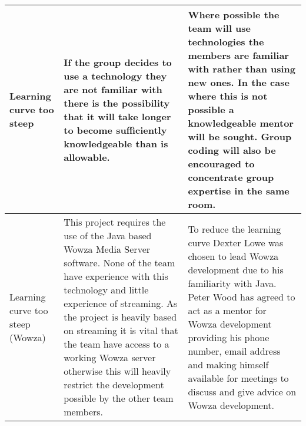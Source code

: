 \begin{center}
\begin{landscape}
\begin{longtable}{|p{3cm}|p{7cm}|p{12cm}|}
        Learning curve too steep                         & If the group decides to use a technology they are not familiar with there is the possibility that it will take longer to become sufficiently knowledgeable than is allowable.                                                                                                                                                                                                & Where possible the team will use technologies the members are familiar with rather than using new ones. In the case where this is not possible a knowledgeable mentor will be sought. Group coding will also be encouraged to concentrate group expertise in the same room.                                                                                                                                                                                                                                                                                                                                                                                                                                                                                                                                                                                                                                                                                                                                                              \\ \hline
        Learning curve too steep (Wowza)                 & This project requires the use of the Java based Wowza Media Server software. None of the team have experience with this technology and little experience of streaming. As the project is heavily based on streaming it is vital that the team have access to a working Wowza server otherwise this will heavily restrict the development possible by the other team members. & To reduce the learning curve Dexter Lowe was chosen to lead Wowza development due to his familiarity with Java. Peter Wood has agreed to act as a mentor for Wowza development providing his phone number, email address and making himself available for meetings to discuss and give advice on Wowza development.                                                                                                                                                                                                                                                                                                                                                                                                                                                                                                                                                                                                                                                                                                                      \\ \hline

\end{longtable}
\end{landscape}
\end{center}
